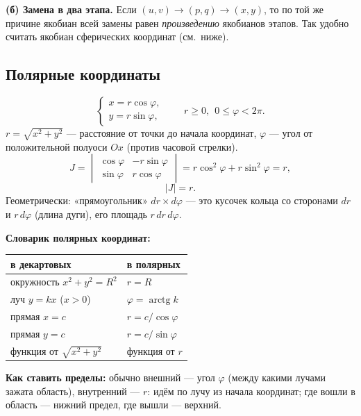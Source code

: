 \textbf{(б) Замена в два этапа.} Если $(u,v)\to(p,q)\to(x,y)$, то по той же причине якобиан всей замены равен \emph{произведению} якобианов этапов. Так удобно считать якобиан сферических координат (см.\ ниже).

\subsection{Полярные координаты}
\begin{minipage}{0.55\linewidth}
\[
\begin{cases}x=r\cos\varphi,\\ y=r\sin\varphi,\end{cases}\qquad r\geqslant0,\ \ 0\leqslant\varphi<2\pi .
\]
$r=\sqrt{x^2+y^2}$ --- расстояние от точки до начала координат, $\varphi$ --- угол от положительной полуоси $Ox$ (против часовой стрелки).
\[
J=\begin{vmatrix}\cos\varphi&-r\sin\varphi\\ \sin\varphi&r\cos\varphi\end{vmatrix}=r\cos^2\varphi+r\sin^2\varphi=r,
\]
\[|J|=r .
\]
Геометрически: «прямоугольник» $dr\times d\varphi$ --- это кусочек кольца со сторонами $dr$ и $r\,d\varphi$ (длина дуги), его площадь $r\,dr\,d\varphi$.
\end{minipage}\hfill
\begin{minipage}{0.4\linewidth}\centering
{}
\end{minipage}

\textbf{Словарик полярных координат:}
\begin{center}
\begin{tabular}{ll}
\toprule
в декартовых & в полярных\\
\midrule
окружность $x^2+y^2=R^2$ & $r=R$\\
луч $y=kx$ ($x>0$) & $\varphi=\operatorname{arctg}k$\\
прямая $x=c$ & $r=c/\cos\varphi$\\
прямая $y=c$ & $r=c/\sin\varphi$\\
функция от $\sqrt{x^2+y^2}$ & функция от $r$\\
\bottomrule
\end{tabular}
\end{center}
\textbf{Как ставить пределы:} обычно внешний --- угол $\varphi$ (между какими лучами зажата область), внутренний --- $r$: идём по лучу из начала координат; где вошли в область --- нижний предел, где вышли --- верхний.

